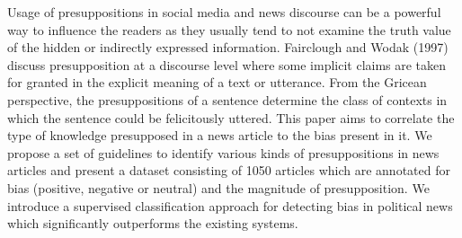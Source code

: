 Usage of presuppositions in social media and news discourse can be a powerful way to influence the readers as they usually tend to not examine the truth value of the hidden or indirectly expressed information. Fairclough and Wodak (1997) discuss presupposition at a discourse level where some implicit claims are taken for granted in the explicit meaning of a text or utterance. From the Gricean perspective, the presuppositions of a sentence determine the class of contexts in which the sentence could be felicitously uttered.  This paper aims to correlate the type of knowledge presupposed in a news article to the bias present in it. We propose a set of guidelines to identify various kinds of presuppositions in news articles and present a dataset consisting of 1050 articles which are annotated for bias (positive, negative or neutral) and the magnitude of presupposition. We introduce a supervised classification approach for detecting bias in political news which significantly outperforms the existing systems.
